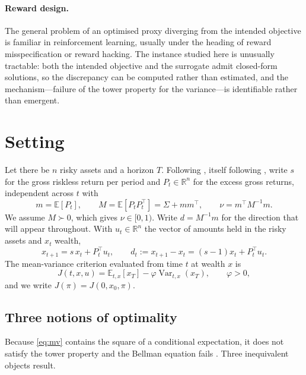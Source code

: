\documentclass[11pt,a4paper]{article}
\theoremstyle{plain}
\theoremstyle{definition}
\theoremstyle{remark}
\newcommand{\R}{\mathbb{R}}
\newcommand{\E}{\mathbb{E}}
\newcommand{\Var}{\operatorname{Var}}
\begin{document}
\paragraph{Reward design.} The general problem of an optimised proxy diverging
from the intended objective is familiar in reinforcement learning, usually under
the heading of reward misspecification or reward hacking. The instance studied
here is unusually tractable: both the intended objective and the surrogate admit
closed-form solutions, so the discrepancy can be computed rather than estimated,
and the mechanism---failure of the tower property for the variance---is
identifiable rather than emergent.

\section{Setting}\label{sec:setting}

Let there be $n$ risky assets and a horizon $T$. Following \citet{hambly}, itself
following \citet{ling}, write $s$ for the gross riskless return per period and
$P_t\in\R^{n}$ for the excess gross returns, independent across $t$ with
\begin{equation}
m=\E[P_t],\qquad M=\E[P_tP_t^{\top}]=\Sigma+mm^{\top},\qquad
\nu=m^{\top}M^{-1}m .
\end{equation}
We assume $M\succ0$, which gives $\nu\in[0,1)$. Write $d=M^{-1}m$ for the
direction that will appear throughout. With $u_t\in\R^{n}$ the vector of amounts
held in the risky assets and $x_t$ wealth,
\begin{equation}
x_{t+1}=s\,x_t+P_t^{\top}u_t ,\qquad d_t:=x_{t+1}-x_t=(s-1)x_t+P_t^{\top}u_t .
\label{eq:dynamics}
\end{equation}
The mean-variance criterion evaluated from time $t$ at wealth $x$ is
\begin{equation}
J(t,x,u)=\E_{t,x}[x_T]-\varphi\Var_{t,x}(x_T),\qquad \varphi>0,
\label{eq:mv}
\end{equation}
and we write $J(\pi)=J(0,x_0,\pi)$.

\subsection{Three notions of optimality}

Because \eqref{eq:mv} contains the square of a conditional expectation, it does
not satisfy the tower property and the Bellman equation fails
\citep{strotz,bjork}. Three inequivalent objects result.
\end{document}
